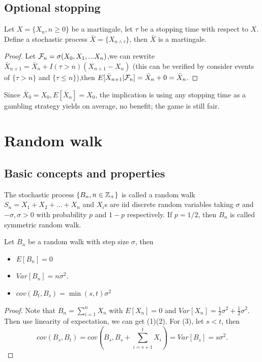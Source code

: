 \begin{refsection}
\subsection{Optional stopping}
\begin{theorem}\label{ch:theory-of-stochastic-process:th:optionalstoppingtheorem}
Let $X=\{X_n,n\geq 0\}$ be a martingale, let $\tau$ be a stopping time with respect to $X$. Define a stochastic process $\bar{X}=\{X_{n\wedge \tau}\}$, then $\bar{X}$ is a martingale. 
\end{theorem}
\begin{proof}
Let $\mathcal{F}_n = \sigma(X_0,X_1,...X_n)$,we can rewrite $\bar{X}_{n+1} = \bar{X}_n + I(\tau > n)(X_{n+1}-X_n)$ (this can be verified by consider events of $\{\tau > n\}$ and $\{\tau \leq n\}$),then $E[\bar{X}_{n+1}|\mathcal{F}_n] = \bar{X}_n+0 = \bar{X}_n$.	
\end{proof}


\begin{remark}
Since $\bar{X}_0 = X_0, E[\bar{X}_n]=X_0$, the implication is using any stopping time as a
gambling strategy yields on average, no benefit; the game is still fair. 
\end{remark}


\section{Random walk}
\subsection{Basic concepts and properties}
\begin{definition}
The stochastic process $\{B_n,n\in \mathbb{Z}_+\}$ is called a random walk $S_n = X_1 + X_2 + ... + X_n$ and $X_i$s are iid discrete random variables taking $\sigma$ and $-\sigma, \sigma > 0$ with probability $p$ and $1-p$ respectively. If $p=1/2$, then $B_n$ is called symmetric random walk. 
\end{definition}

\begin{lemma}\label{ch:theory-of-stochastic-process:randomwalkbasicproperty}
Let $B_n$ be a random walk with step size $\sigma$, then
\begin{itemize}
	\item $E[B_n]  =0 $
	\item $Var[B_n] = n\sigma^2$.
	\item $cov(B_t,B_s) = \min(s,t)\sigma^2$
\end{itemize}
\end{lemma}
\begin{proof}
Note that $B_n = \sum_{i=1}^n X_n$ with $E[X_n] = 0$ and $Var[X_n] = \frac{1}{2}\sigma^2 + \frac{1}{2}\sigma^2$. Then use linearity of expectation, we can get (1)(2). For (3), let $s<t$, then $$cov(B_s,B_t) = cov(B_s,B_s +\sum_{i=s+1}^t X_i) = Var[B_s] = s\sigma^2.$$
\end{proof}





\end{refsection}
